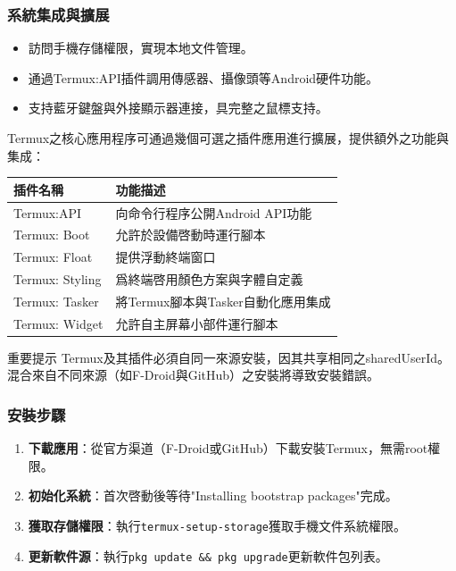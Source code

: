 \subsubsection*{系統集成與擴展}

\begin{itemize}
  \item 訪問手機存儲權限，實現本地文件管理。
  \item 通過Termux:API插件調用傳感器、攝像頭等Android硬件功能。
  \item 支持藍牙鍵盤與外接顯示器連接，具完整之鼠標支持。
\end{itemize}


Termux之核心應用程序可通過幾個可選之插件應用進行擴展，提供額外之功能與集成：

\begin{center}
\begin{tabularx}{\linewidth}{|X|X|}
\hline
\textbf{插件名稱} & \textbf{功能描述} \tabularnewline
\hline
Termux:API & 向命令行程序公開Android API功能 \tabularnewline
Termux: Boot & 允許於設備啓動時運行腳本 \tabularnewline
Termux: Float & 提供浮動終端窗口 \tabularnewline
Termux: Styling & 爲終端啓用顏色方案與字體自定義 \tabularnewline
Termux: Tasker & 將Termux腳本與Tasker自動化應用集成 \tabularnewline
Termux: Widget & 允許自主屏幕小部件運行腳本 \tabularnewline
\hline
\end{tabularx}
\end{center}

\begin{tcbwarn}{重要提示}
Termux及其插件必須自同一來源安裝，因其共享相同之sharedUserId。混合來自不同來源（如F-Droid與GitHub）之安裝將導致安裝錯誤。

\end{tcbwarn}


\subsubsection*{安裝步驟}

\begin{enumerate}
  \item \textbf{下載應用}：從官方渠道（F-Droid或GitHub）下載安裝Termux，無需root權限。
  \item \textbf{初始化系統}：首次啓動後等待"Installing bootstrap packages"完成。
  \item \textbf{獲取存儲權限}：執行\texttt{termux-\allowbreak setup-\allowbreak storage}獲取手機文件系統權限。
  \item \textbf{更新軟件源}：執行\texttt{pkg update \&\& pkg upgrade}更新軟件包列表。
\end{enumerate}

